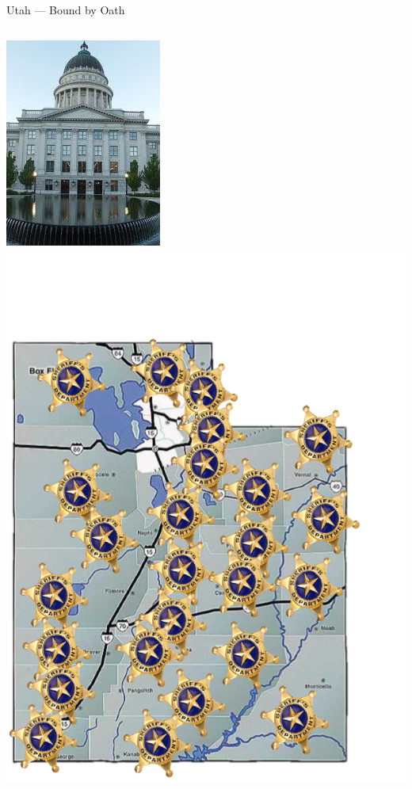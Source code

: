 \begin{frame}{Utah --- Bound by Oath}
    \begin{columns}[c]
            \centering
            \includegraphics[height=0.9\textheight]{img/utah-capitol.png} \\
        \column{0.5\textheight}
            \centering
            \includegraphics[height=0.9\textheight]{img/utah-sheriffs.png} \\
    \end{columns}
\end{frame}

